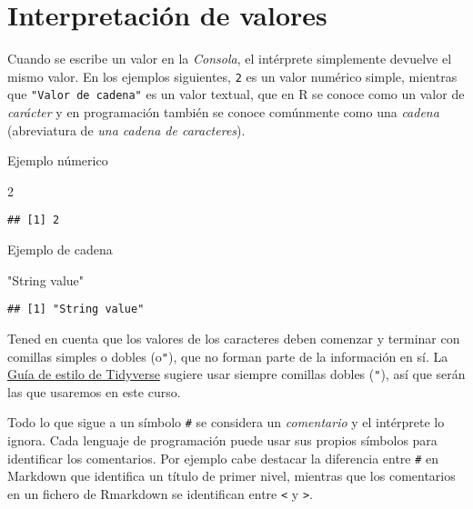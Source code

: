 \documentclass[
]{book}
\newenvironment{Shaded}{\begin{snugshade}}{\end{snugshade}}
\newcommand{\DecValTok}[1]{\textcolor[rgb]{0.00,0.00,0.81}{#1}}
\newcommand{\StringTok}[1]{\textcolor[rgb]{0.31,0.60,0.02}{#1}}
\begin{document}
\hypertarget{interpretaciuxf3n-de-valores}{%
\section{Interpretación de valores}\label{interpretaciuxf3n-de-valores}}

Cuando se escribe un valor en la \emph{Consola}, el intérprete simplemente devuelve el mismo valor. En los ejemplos siguientes, \texttt{2} es un valor numérico simple, mientras que \texttt{"Valor\ de\ cadena"} es un valor textual, que en R se conoce como un valor de \emph{carácter} y en programación también se conoce comúnmente como una \emph{cadena} (abreviatura de \emph{una cadena de caracteres}).

Ejemplo númerico

\begin{Shaded}
\begin{Highlighting}[]
\DecValTok{2}
\end{Highlighting}
\end{Shaded}

\begin{verbatim}
## [1] 2
\end{verbatim}

Ejemplo de cadena

\begin{Shaded}
\begin{Highlighting}[]
\StringTok{"String value"}
\end{Highlighting}
\end{Shaded}

\begin{verbatim}
## [1] "String value"
\end{verbatim}

Tened en cuenta que los valores de los caracteres deben comenzar y terminar con comillas simples o dobles (\texttt{\textquotesingle{}}o\texttt{"}), que no forman parte de la información en sí. La \href{https://style.tidyverse.org\%20/syntax.html}{Guía de estilo de Tidyverse} sugiere usar siempre comillas dobles (\texttt{"}), así que serán las que usaremos en este curso.

Todo lo que sigue a un símbolo \texttt{\#} se considera un \emph{comentario} y el intérprete lo ignora. Cada lenguaje de programación puede usar sus propios símbolos para identificar los comentarios. Por ejemplo cabe destacar la diferencia entre \texttt{\#} en Markdown que identifica un título de primer nivel, mientras que los comentarios en un fichero de Rmarkdown se identifican entre \texttt{\textless{}} y \texttt{\textgreater{}}.
\end{document}
